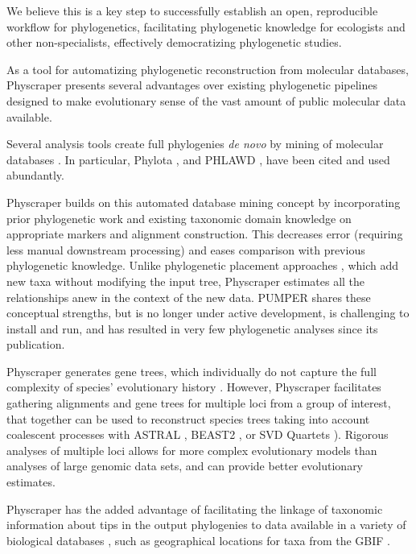 \documentclass{bmcart}
\begin{document}
We believe this is a key step to successfully establish an open, reproducible workflow for phylogenetics,
facilitating phylogenetic knowledge for ecologists and other non-specialists, effectively
democratizing phylogenetic studies.

As a tool for automatizing phylogenetic reconstruction from molecular databases,
Physcraper presents several advantages over existing phylogenetic pipelines designed to
make evolutionary sense of the vast amount of
public molecular data available.

Several analysis tools create full phylogenies \textit{de novo} by mining of molecular
databases \cite{antonelli2017toward, sanderson2008phylota, smith2019pyphlawd,
bennett2018phylotar, pearse2013phylogenerator}.
In particular, Phylota \cite{sanderson2008phylota},
and PHLAWD \cite{smith2009mega}, have been cited and used abundantly.

Physcraper builds on this automated database mining concept by incorporating prior
phylogenetic work and existing taxonomic domain knowledge on appropriate markers
and alignment construction.
This decreases error (requiring less manual downstream processing) and
eases comparison with previous phylogenetic
knowledge.
Unlike phylogenetic placement approaches \cite{berger_performance_2011, matsen_pplacer_2010},
which add new taxa without modifying the input tree, Physcraper estimates all
the relationships anew in the context of the new data.
PUMPER \cite{izquierdo2014pumper} shares these conceptual strengths, but is no
longer under active development, is challenging to install and run, and has resulted
in very few phylogenetic analyses since its publication.

Physcraper generates gene trees, which individually do not capture the full complexity
of species' evolutionary history \cite{song2012resolving}.
However, Physcraper facilitates
gathering alignments and gene trees for multiple loci from a group of interest,
that together can be used to reconstruct species trees taking into account coalescent
processes with ASTRAL \cite{mirarab2014astral},
BEAST2 \cite{bouckaert2019beast}, or SVD Quartets \cite{chifman2014quartet}).
Rigorous analyses of multiple loci allows for more complex evolutionary models
than analyses of large genomic data sets, and can provide better evolutionary estimates.

Physcraper has the added advantage of facilitating the linkage of taxonomic information about tips
in the output phylogenies to data available in a variety of biological databases
\cite{rees2017automated}, such as
geographical locations for taxa from the GBIF \cite{gbif_secretariat_gbif_2019}.
\end{document}
